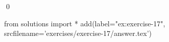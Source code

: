 
\begin{ex} 
  \label{ex:exercise-17}
  
  \qed
\end{ex} 
\begin{python0}
from solutions import *
add(label="ex:exercise-17",
    srcfilename='exercises/exercise-17/answer.tex') 
\end{python0}
